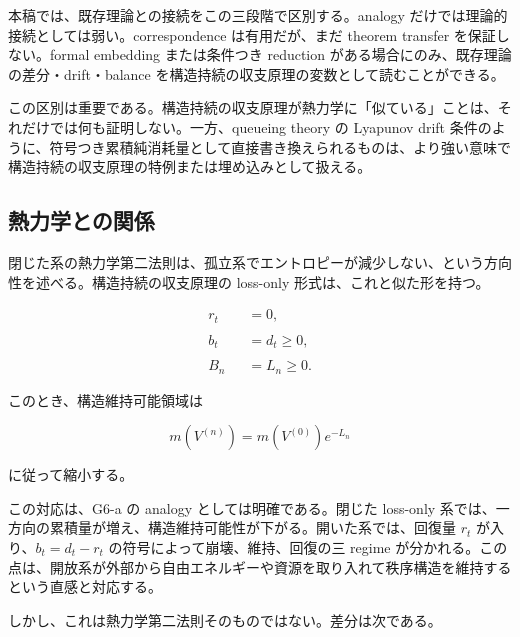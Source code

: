 \documentclass[12pt,a4paper]{article}
\begin{document}
本稿では、既存理論との接続をこの三段階で区別する。analogy だけでは理論的接続としては弱い。correspondence は有用だが、まだ theorem transfer を保証しない。formal embedding または条件つき reduction がある場合にのみ、既存理論の差分・drift・balance を構造持続の収支原理の変数として読むことができる。

この区別は重要である。構造持続の収支原理が熱力学に「似ている」ことは、それだけでは何も証明しない。一方、queueing theory の Lyapunov drift 条件のように、符号つき累積純消耗量として直接書き換えられるものは、より強い意味で構造持続の収支原理の特例または埋め込みとして扱える。

\subsection{熱力学との関係}\label{ux71b1ux529bux5b66ux3068ux306eux95a2ux4fc2}

閉じた系の熱力学第二法則は、孤立系でエントロピーが減少しない、という方向性を述べる。構造持続の収支原理の loss-only 形式は、これと似た形を持つ。

\[
\begin{aligned}
r_{t}&=0, \\
\qquad \\
b_{t}&=d_{t}\ge 0, \\
\qquad \\
B_{n}&=L_{n}\ge 0.
\end{aligned}
\]

このとき、構造維持可能領域は

\[
m(V^{(n)})=m(V^{(0)})e^{-L_{n}}
\]

に従って縮小する。

この対応は、G6-a の analogy としては明確である。閉じた loss-only 系では、一方向の累積量が増え、構造維持可能性が下がる。開いた系では、回復量 \(r_{t}\) が入り、\(b_{t}=d_{t}-r_{t}\) の符号によって崩壊、維持、回復の三 regime が分かれる。この点は、開放系が外部から自由エネルギーや資源を取り入れて秩序構造を維持するという直感と対応する。

しかし、これは熱力学第二法則そのものではない。差分は次である。
\end{document}
